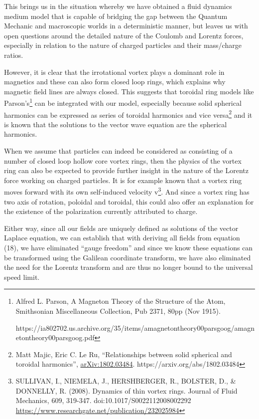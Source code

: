 \documentclass[a4paper]{article}
\newcommand\textstyleNone[1]{#1}
\begin{document}
This brings us in the situation whereby we have obtained a fluid dynamics medium model that is capable of bridging the
gap between the Quantum Mechanic and macroscopic worlds in a deterministic manner, but leaves us with open questions
around the detailed nature of the Coulomb and Lorentz forces, especially in relation to the nature of charged particles
and their mass/charge ratios. 

However, it is clear that the irrotational vortex plays a dominant role in magnetics and these can also form closed loop
rings, which explains why magnetic field lines are always closed. This suggests that toroidal ring models like
Parson's\footnote{Alfred L. Parson, {\textquotedbl}A Magneton Theory of the Structure of the Atom{\textquotedbl},
Smithsonian Miscellaneous Collection, Pub 2371, 80pp (Nov 1915).  \par
https://ia802702.us.archive.org/35/items/amagnetontheory00parsgoog/amagnetontheory00parsgoog.pdf\par }\textsuperscript{
} can be integrated with our model, especially because solid spherical harmonics can be expressed as series of toroidal
harmonics and vice versa\footnote{ Matt Majic, Eric C. Le Ru, ``Relationships between solid spherical and toroidal
harmonics'', \href{https://arxiv.org/abs/1802.03484}{arXiv:1802.03484}. https://arxiv.org/abs/1802.03484\par
}\textsuperscript{ }and it is known that the solutions to the vector wave equation are the spherical harmonics.

When we assume that particles can indeed be considered as consisting of a number of closed loop hollow core vortex
rings, then the physics of the vortex ring can also be expected to provide further insight in the nature of the Lorentz
force working on charged particles. It is for example known that a vortex ring moves forward with its own self-induced
velocity v\footnote{ SULLIVAN, I., NIEMELA, J., HERSHBERGER, R., BOLSTER, D., \& DONNELLY, R. (2008). Dynamics of thin
vortex rings. Journal of Fluid Mechanics, 609, 319-347. doi:10.1017/S0022112008002292 
\url{https://www.researchgate.net/publication/232025984} \par }. And since a vortex ring has two axis of rotation,
poloidal and toroidal, this could also offer an explanation for the existence of the polarization currently attributed
to charge.  

{
\textstyleNone{{Either way,
s}{ince all
}{our}{ fields
are uniquely defined as solutions of the vector Laplace equation,
}{we can establish that with deriving all fields from equation
}{(18)}{, we
have eliminated ``gauge freedom'' and since we know these equations can be transformed using the Galilean coordinate
transform, we have also eliminated the need for the Lorentz transform
}{and are thus no longer bound to the universal speed
limit}{.}}}
\end{document}
